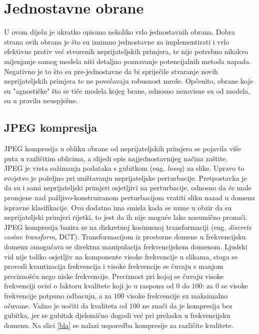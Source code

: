 \documentclass[utf8, diplomski]{fer}
\begin{document}
\section{Jednostavne obrane}
U ovom dijelu je ukratko opisano nekoliko vrlo jednostavnih obrana. Dobra strana ovih obrana je što su iznimno jednostavne za implementirati i vrlo efektivne protiv već stvorenih neprijateljskih primjera, te nije potrebno nikakvo mijenjanje samog modela niti detaljno poznavanje potencijalnih metoda napada. Negativno je to što su pre-jednostavne da bi spriječile stvaranje novih neprijateljskih primjera te ne povećavaju robusnost mreže. Općenito, obrane koje su "agnostičke" što se tiče modela kojeg brane, odnosno nezavisne su od modela, su u pravilu neuspješne.
\subsection{JPEG kompresija}\label{jpeg_comp}
JPEG kompresija u obliku obrane od neprijateljskih primjera se pojavila više puta u različitim oblicima\citep{jpeg1}\citep{jpeg2}\citep{jpeg3}, a slijedi opis najjednostavnijeg načina zaštite. \\
JPEG je vrsta sažimanja podataka s gubitkom (eng. \textit{lossy}) za slike. Upravo to svojstvo je poželjno pri uništavanju neprijateljske perturbacije. Pretpostavka je da su i sami neprijateljski primjeri osjetljivi na perturbacije, odnosno da će male promjene nad pažljivo-konstruiranom perturbacijom vratiti sliku nazad u domenu ispravne klasifikacije. Ovo dodatno ima smisla kada se uzme u obzir da su neprijateljski primjeri rijetki, to jest da ih nije moguće lako nasumično pronaći. \\
JPEG kompresija bazira se na diskretnoj kosinusnoj transformaciji (eng. \textit{discrete cosine transform}, DCT). Transformacijom iz prostorne domene u frekvencijsku domenu omogućava se direktna manipulacija frekvencijskom domenom. Ljudski vid nije toliko osjetljiv na komponente visoke frekvencije u slikama, stoga se provodi kvantizacija frekvencija i visoke frekvencije se čuvaju s manjom preciznošću nego niske frekvencije. Preciznost pri kojoj se čuvaju visoke frekvenciji ovisi o faktoru kvalitete koji je u rasponu od $0$ do $100$: za $0$ se visoke frekvencije potpuno odbacuju, a za $100$ visoke frekvencije su maksimalno očuvane. Važno je uočiti da kvaliteta od $100$ ne znači da je kompresija bez gubitka, jer se gubitak djelomično dogodi već pri prelasku u frekvencijsku domenu. Na slici \ref{bla} se nalazi usporedba kompresije za različite kvalitete.
\end{document}
